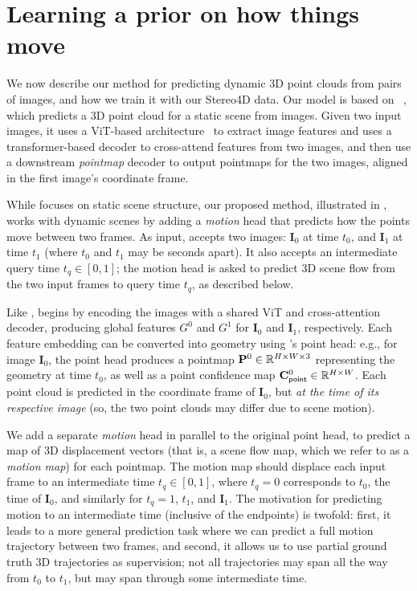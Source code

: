 \section{Learning a prior on how things move}
We now describe our method for predicting dynamic 3D point clouds from pairs of images, and how we train it with our Stereo4D data.
Our model is based on \duster~\cite{wang2024dust3r}, which predicts a 3D point cloud for a static scene from images. Given two input images, it uses a ViT-based architecture~\cite{dosovitskiy2020image} to extract image features and uses a transformer-based decoder to cross-attend features from two images, and then use a downstream \textit{pointmap} decoder to output pointmaps for the two images, aligned in the first image's coordinate frame. 

While \duster focuses on static scene structure, our proposed \method method, illustrated in , works with dynamic scenes by adding a \textit{motion} head that predicts how the points move between two frames. 
As input, \method accepts two images: $\mathbf{I}_0$ at time $t_0$, and $\mathbf{I}_1$ at time $t_1$ (where $t_0$ and $t_1$ may be seconds apart). 
It also accepts an intermediate query time $t_q \in [0,1]$; the motion head is asked to predict 3D scene flow from the two input frames to query time $t_q$, as described below.

Like \duster, \method begins by encoding the images with a shared ViT and cross-attention decoder, producing global features $G^0$ and $G^1$ for $\mathbf{I}_0$ and $\mathbf{I}_1$, respectively.
Each feature embedding can be converted into geometry using \duster's point head: e.g., for image $\mathbf{I}_0$, the point head produces a pointmap $\mathbf{P}^0 \in \mathbb{R}^{H \times W \times 3}$ representing the geometry at time $t_0$, as well as a point confidence map $\mathbf{C}^0_\mathsf{point} \in \mathbb{R}^{H \times W}$. 
Each point cloud is predicted in the coordinate frame of $\mathbf{I}_0$, but \emph{at the time of its respective image} (so, the two point clouds may differ due to scene motion).


We add a separate \textit{motion} head in parallel to the original point head, to predict a map of 3D displacement vectors (that is, a scene flow map, which we refer to as a \emph{motion map}) for each pointmap. 
The motion map should displace each input frame to an intermediate time $t_q \in [0,1]$, where $t_q = 0$ corresponds to $t_0$, the time of $\mathbf{I}_0$, and similarly for $t_q = 1$, $t_1$, and $\mathbf{I}_1$. The motivation for predicting motion to an intermediate time (inclusive of the endpoints) is twofold: first, it leads to a more general prediction task where we can predict a full motion trajectory between two frames, and second, it allows us to use partial ground truth 3D trajectories as supervision; not all trajectories may span all the way from $t_0$ to $t_1$, but may span through some intermediate time.

